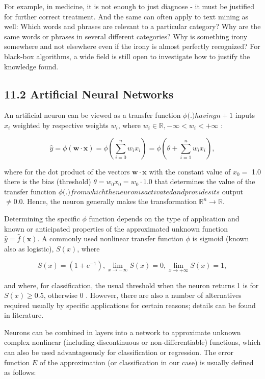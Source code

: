 \documentclass[10pt]{book}
\begin{document}
For example, in medicine, it is not enough to just diagnose - it must be justified for further correct treatment. And the same can often apply to text mining as well: Which words and phrases are relevant to a particular category? Why are the same words or phrases in several different categories? Why is something irony somewhere and not elsewhere even if the irony is almost perfectly recognized? For black-box algorithms, a wide field is still open to investigate how to justify the knowledge found.

\subsection*{11.2 Artificial Neural Networks}
An artificial neuron can be viewed as a transfer function $\phi($.$) having n+1$ inputs $x_{i}$ weighted by respective weights $w_{i}$, where $w_{i} \in \mathbb{R},-\infty<w_{i}<+\infty$ :


\begin{equation*}
\hat{y}=\phi(\mathbf{w} \cdot \mathbf{x})=\phi\left(\sum_{i=0}^{n} w_{i} x_{i}\right)=\phi\left(\theta+\sum_{i=1}^{n} w_{i} x_{i}\right), \tag{11.1}
\end{equation*}


where for the dot product of the vectors $\mathbf{w} \cdot \mathbf{x}$ with the constant value of $x_{0}=$ 1.0 there is the bias (threshold) $\theta=w_{0} x_{0}=w_{0} \cdot 1.0$ that determines the value of the transfer function $\phi($.$) from which the neuron is activated and provides its$ output $\neq 0.0$. Hence, the neuron generally makes the transformation $\mathbb{R}^{n} \rightarrow \mathbb{R}$.

Determining the specific $\phi$ function depends on the type of application and known or anticipated properties of the approximated unknown function $\hat{y}=\hat{f}(\mathbf{x})$. A commonly used nonlinear transfer function $\phi$ is sigmoid (known also as logistic), $S(x)$, where

$$
S(x)=\left(1+e^{-1}\right), \lim _{x \rightarrow-\infty} S(x)=0, \lim _{x \rightarrow+\infty} S(x)=1,
$$

and where, for classification, the usual threshold when the neuron returns 1 is for $S(x) \geq 0.5$, otherwise 0 . However, there are also a number of alternatives required usually by specific applications for certain reasons; details can be found in literature.

Neurons can be combined in layers into a network to approximate unknown complex nonlinear (including discontinuous or non-differentiable) functions, which can also be used advantageously for classification or regression. The error function $E$ of the approximation (or classification in our case) is usually defined as follows:
\end{document}
